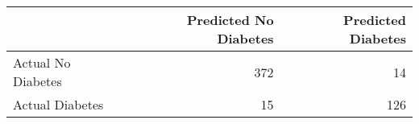 \begin{tabular}{lrr}
\toprule
 & Predicted No Diabetes & Predicted Diabetes \\
\midrule
Actual No Diabetes & 372 & 14 \\
Actual Diabetes & 15 & 126 \\
\bottomrule
\end{tabular}
